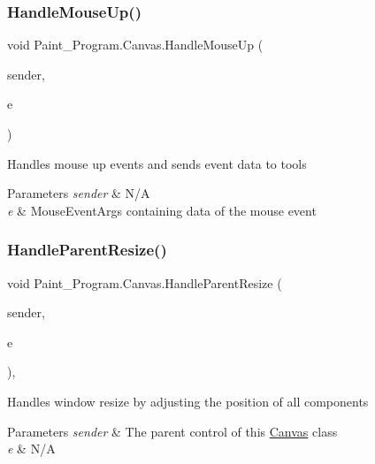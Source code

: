 \subsubsection{\texorpdfstring{Handle\+Mouse\+Up()}{HandleMouseUp()}}
{\footnotesize\ttfamily void Paint\+\_\+\+Program.\+Canvas.\+Handle\+Mouse\+Up (\begin{DoxyParamCaption}\item[{object}]{sender,  }\item[{Mouse\+Event\+Args}]{e }\end{DoxyParamCaption})\hspace{0.3cm}{\ttfamily [inline]}}



Handles mouse up events and sends event data to tools 


\begin{DoxyParams}{Parameters}
{\em sender} & N/A\\
\hline
{\em e} & Mouse\+Event\+Args containing data of the mouse event\\
\hline
\end{DoxyParams}
\mbox{\label{class_paint___program_1_1_canvas_a03a3c5c5aa5410c596ca804543048cd2}} 
\subsubsection{\texorpdfstring{Handle\+Parent\+Resize()}{HandleParentResize()}}
{\footnotesize\ttfamily void Paint\+\_\+\+Program.\+Canvas.\+Handle\+Parent\+Resize (\begin{DoxyParamCaption}\item[{object}]{sender,  }\item[{Event\+Args}]{e }\end{DoxyParamCaption})\hspace{0.3cm}{\ttfamily [inline]}, {\ttfamily [private]}}



Handles window resize by adjusting the position of all components 


\begin{DoxyParams}{Parameters}
{\em sender} & The parent control of this \mbox{\hyperlink{class_paint___program_1_1_canvas}{Canvas}} class\\
\hline
{\em e} & N/A\\
\hline
\end{DoxyParams}
\mbox{\label{class_paint___program_1_1_canvas_a9cf2287e46eb0e4408c936f9d063662e}} 

